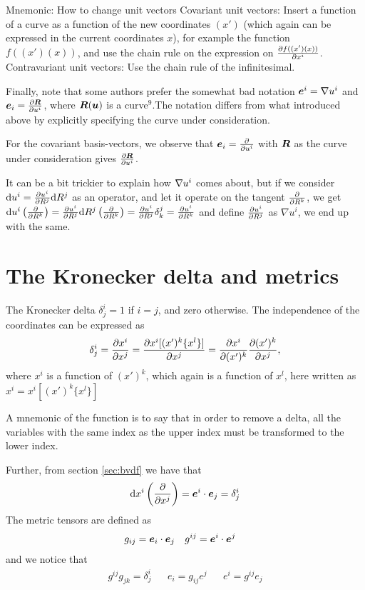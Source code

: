 \documentclass[a4paper, 12pt]{article}
\begin{document}
\vspace{0.5cm}
\begin{greenbox}{Mnemonic: How to change unit vectors}
 Covariant unit vectors: Insert a function of a curve as a function of the new 
 coordinates $(x')$ (which again can be expressed in the current coordinates 
 $x$), for example the function $f((x')(x))$, and use the chain rule on the 
 expression on $\frac{\partial {f((x')(x))}}{\partial{x^i}}$.\\
 Contravariant unit vectors: Use the chain rule of the infinitesimal.
\end{greenbox}
%
Finally, note that some authors prefer the somewhat bad notation $\boldsymbol{e}^i = 
\nabla u^i$ and $\boldsymbol{e}_i = \frac{\partial {\boldsymbol{R}}}{\partial{u^i}}$, where $\boldsymbol{R}(\boldsymbol{u})$ is a 
curve\hyperref[note:curve]{$^9$}.The notation differs from what introduced 
above by explicitly specifying the curve under consideration.

For the covariant basis-vectors, we observe that $\boldsymbol{e}_i = \frac{\partial {}}{\partial{u^i}}$ 
with $\boldsymbol{R}$ as the curve under consideration gives $\frac{\partial {\boldsymbol{R}}}{\partial{u^i}}$.

It can be a bit trickier to explain how $\nabla u^i$ comes about, but if we 
consider $\text{d} u^i = \frac{\partial {u^i}}{\partial{R^j}} \text{d} R^j$ as an operator, and let it operate 
on the tangent $\frac{\partial {}}{\partial{R^k}}$, we get $\text{d} u^i\left(\frac{\partial {}}{\partial{R^k}}\right) = 
\frac{\partial {u^i}}{\partial{R^j}} \text{d} R^j\left(\frac{\partial {}}{\partial{R^k}}\right) = \frac{\partial {u^i}}{\partial{R^j}} \delta^j_k = 
\frac{\partial {u^i}}{\partial{R^k}}$ and define $\frac{\partial {u^i}}{\partial{R^j}}$ as $\nabla u^i$, we end up with 
the same.





\section{The Kronecker delta and metrics}
The Kronecker delta $\delta^i_j = 1$ if $i=j$, and zero otherwise. The 
independence of the coordinates can be expressed as
%
\begin{align*}
 \delta^i_j = \frac{\partial {x^i}}{\partial{x^j}} = \frac{\partial {x^i[(x')^k\{x^l\}]}}{\partial{x^j}} = 
 \frac{\partial {x^i}}{\partial{(x')^k}}\frac{\partial {(x')^k}}{\partial{x^j}},
\end{align*}
%
where $x^i$ is a function of $(x')^k$, which again is a function of $x^l$, here 
written as $x^i = x^i[(x')^k\{x^l\}]$

A mnemonic of the function is to say that in order to remove a delta, all the 
variables with the same index as the upper index must be transformed to the 
lower index.

Further, from section \ref{sec:bvdf} we have that
%
\begin{align*}
 \text{d} x^i \left(\frac{\partial {}}{\partial{x^j}}\right) = \boldsymbol{e}^i\cdot\boldsymbol{e}_j = \delta^i_j
\end{align*}
%
The metric tensors are defined as
%
\begin{align*}
 &g_{ij} = \boldsymbol{e}_i\cdot\boldsymbol{e}_j&
 &g^{ij} = \boldsymbol{e}^i\cdot\boldsymbol{e}^j
\end{align*}
%
and we notice that
%
\begin{align*}
 &g^{ij} g_{jk} = \delta^i_j&
 &e_i = g_{ij}e^j &
 &e^i = g^{ij}e_j&
\end{align*}
\end{document}
